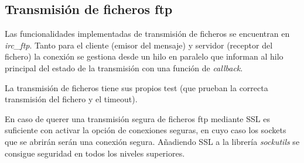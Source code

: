\subsection{Transmisión de ficheros ftp}

Las funcionalidades implementadas de transmisión de ficheros se encuentran en \textit{irc\_ftp}. Tanto para el cliente (emisor del mensaje) y servidor (receptor del fichero) la conexión se gestiona desde un hilo en paralelo que informan al hilo principal del estado de la transmisión con una función de \textit{callback}. 

La transmisión de ficheros tiene sus propios test (que prueban la correcta transmisión del fichero y el timeout).

En caso de querer una transmisión segura de ficheros ftp mediante SSL es suficiente con activar la opción de conexiones seguras, en cuyo caso los sockets que se abrirán serán una conexión segura. Añadiendo SSL a la librería \textit{sockutils} se consigue seguridad en todos los niveles superiores.
